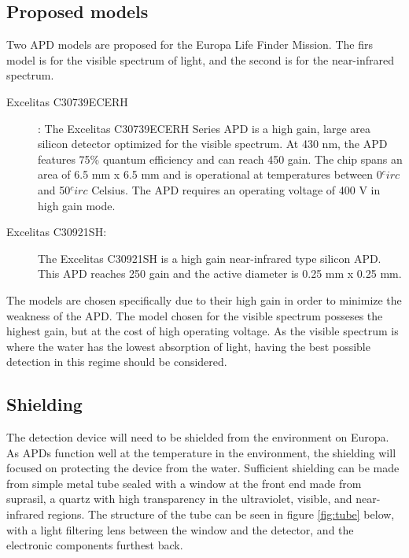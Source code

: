 \subsection{Proposed models}
Two APD models are proposed for the Europa Life Finder Mission. The firs model is for the visible spectrum of light, and the second is for the near-infrared spectrum.

\begin{description}
\item[Excelitas C30739ECERH]:
The Excelitas C30739ECERH Series APD is a high gain, large area silicon detector optimized for the visible spectrum. At 430 nm, the APD features 75\% quantum efficiency and can reach 450 gain. The chip spans an area of 6.5 mm x 6.5 mm and is operational at temperatures between 0$^circ$ and 50$^circ$ Celsius. The APD requires an operating voltage of 400 V in high gain mode.
\item[Excelitas C30921SH:]
The Excelitas C30921SH is a high gain near-infrared type silicon APD. This APD reaches 250 gain and the active diameter is 0.25 mm x 0.25 mm.
\end{description}

The models are chosen specifically due to their high gain in order to minimize the weakness of the APD. The model chosen for the visible spectrum posseses the highest gain, but at the cost of high operating voltage. As the visible spectrum is where the water has the lowest absorption of light, having the best possible detection in this regime should be considered.

\subsection{Shielding}
The detection device will need to be shielded from the environment on Europa. As APDs function well at the temperature in the environment, the shielding will focused on protecting the device from the water. Sufficient shielding can be made from simple metal tube sealed with a window at the front end made from suprasil, a quartz with high transparency in the ultraviolet, visible, and near-infrared regions. The structure of the tube can be seen in figure \ref{fig:tube} below, with a light filtering lens between the window and the detector, and the electronic components furthest back.

